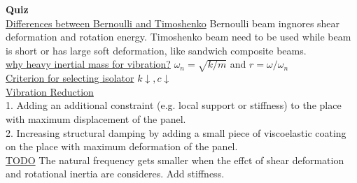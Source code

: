 \documentclass{article}
\begin{document}
\begin{multicols*}{2}

  \noindent\textbf{Quiz}\\
  \underline{Differences between Bernoulli and Timoshenko} Bernoulli beam ingnores shear deformation and rotation energy. Timoshenko beam need to be used while beam is short or has large soft deformation, like sandwich composite beams.\\
  \underline{why heavy inertial mass for vibration?} $\omega_n=\sqrt{k/m}$ and $r=\omega/\omega_n$\\
  \underline{Criterion for selecting isolator} $k \downarrow, c \downarrow$ \\
  \underline{Vibration Reduction}\\
  1. Adding an additional constraint (e.g. local support or stiffness) to the place with maximum displacement of the panel.\\
  2. Increasing structural damping by adding a small piece of viscoelastic coating on the place with maximum deformation of the panel. \\
  \underline{TODO} The natural frequency gets smaller when the effct of shear deformation and rotational inertia are consideres. Add stiffness.\\
                                                                                                                                                                                                                                                                                                                                                                                                                                                                                                                                                                                                                                                                                                                                                                                                                                                                                                                                                                                                                                                                                                                                                                                                                                                                                                                                                                                                                                                                             

\end{multicols*}
\end{document}
